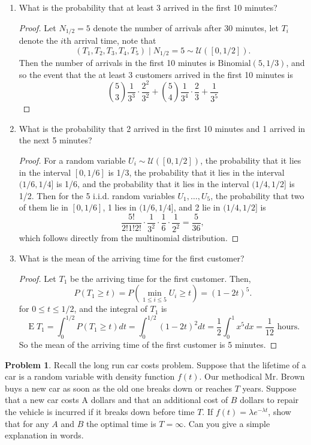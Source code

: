 \documentclass[oneside]{amsart}
\DeclareMathOperator{\E}{\mathrm{E}}
\newcommand{\U}{\mathcal{U}}
\newcommand{\Bin}{\mathrm{Binomial}}
\theoremstyle{definition}
\newtheorem{prob}{Problem}
\begin{document}
\begin{enumerate}[label=(\roman*)]
\item
What is the probability that at least 3 arrived in the first 10 minutes?
\begin{proof}
Let $N_{1/2} = 5$ denote the number of arrivals after 30 minutes, let $T_i$ denote the $i$th arrival time, note that 
\[
	(T_1, T_2, T_3, T_4, T_5) \mid N_{1/2} = 5 \sim \U([0, 1/2]).
\]
Then the number of arrivals in the first 10 minutes is $\Bin(5, 1/3)$, and so the event that the at least 3 customers arrived in the first 10 minutes is 
\[
	\binom{5}{3} \frac{1}{3^3} \cdot \frac{2^2}{3^2}
	+ \binom{5}{4} \frac{1}{3^4}  \cdot  \frac{2}{3}
	+  \frac{1}{3^5} 
\]
\end{proof}
\item
What is the probability that 2 arrived in the first 10 minutes and 1 arrived in the next 5 minutes?
\begin{proof}
For a random variable $U_i \sim \U([0,1/2])$, the probability that it lies in the interval $[0,1/6]$ is 1/3, the probability that it lies in the interval $(1/6, 1/4]$ is 1/6, and the probability that it lies in the interval $(1/4, 1/2]$ is 1/2. Then for the 5 i.i.d. random variables $U_1,\dotsc, U_5$, the probability that two of them lie in $[0,1/6]$, 1 lies in $(1/6, 1/4]$, and 2 lie in $(1/4, 1/2]$ is 
\[
	\frac{5!}{2!1!2!} \cdot \frac{1}{3^2}\cdot \frac{1}{6}\cdot\frac{1}{2^2} = \frac{5}{36},
\]
which follows directly from the multinomial distribution. 
\end{proof}
\item
What is the mean of the arriving time for the first customer?
\begin{proof}
Let $T_1$ be the arriving time for the first customer. Then,
\[
	P(T_1 \geq t) = P\left(\min_{1 \leq i \leq 5} U_i\geq t \right) = (1-2t)^5.
\]
for $0 \leq t \leq 1/2$, and the integral of $T_1$ is
\[
	\E T_1 = \int_0^{1/2} P(T_1 \geq t) dt 
		= \int_0^{1/2} (1-2t)^2 dt
		= \frac{1}{2} \int_0^1 x^5 dx = \frac{1}{12} \text{ hours}.
\]
So the mean of the arriving time of the first customer is 5 minutes.
\end{proof}

\end{enumerate}

\begin{prob}
Recall the long run car costs problem. Suppose that the lifetime of a car is a random variable with density function $f(t)$. Our methodical Mr. Brown buys a new car as soon as the old one breaks down or reaches $T$ years. Suppose that a new car costs A dollars and that an additional cost of $B$ dollars to repair the vehicle is incurred if it breaks down before time $T$. If $f(t) = \lambda e^{-\lambda t}$, show that for any $A$ and $B$ the optimal time is $T=\infty$. Can you give a simple explanation in words.
\end{prob}
\end{document}
